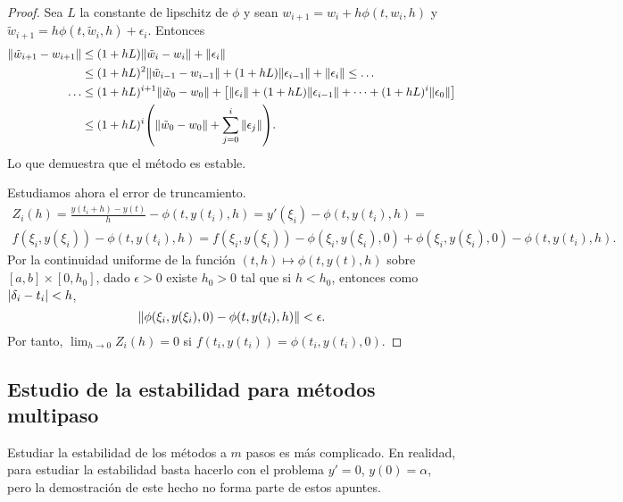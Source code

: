 \begin{proof}
    \newcommand{\tw}{\tilde{w}}
    Sea $L$ la constante de lipschitz de $\phi$ y
    sean $w_{i+1} = w_i + h\phi(t, w_i, h)$ y
    $\tw_{i+1} = h\phi(t, \tw_i, h) + \epsilon_i$.
    Entonces
    \begin{align*}
        \norm{\tw_{i+1} - w_{i+1}} & {} \le
            (1 + hL)\norm{\tw_i - w_i} + \norm{\epsilon_i} \\
        & \le (1 + hL)^2\norm{\tw_{i-1} - w_{i-1}}
            + (1 + hL)\norm{\epsilon_{i-1}} + \norm{\epsilon_i} \le \ldots \\
        \ldots & \le (1 + hL)^{i+1}\norm{\tw_0 - w_0} + \qty[
            \norm{\epsilon_i} + (1 + hL)\norm{\epsilon_{i-1}} + \dots
            + (1 + hL)^i\norm{\epsilon_0}
        ] \\
        & \le (1 + hL)^i\qty(
            \norm{\tw_0 - w_0} + \sum_{j=0}^i \norm{\epsilon_j}
        ).
    \end{align*}
    Lo que demuestra que el método es estable.

    Estudiamos ahora el error de truncamiento.
    \begin{multline*}
        Z_i(h) = \frac{y(t_i + h) - y(t)}{h} - \phi(t, y(t_i), h) =
        y'(\xi_i) - \phi(t, y(t_i), h) = \\
        f(\xi_i, y(\xi_i)) - \phi(t, y(t_i), h) =
        f(\xi_i, y(\xi_i)) - \phi(\xi_i, y(\xi_i), 0)
            + \phi(\xi_i, y(\xi_i), 0) - \phi(t, y(t_i), h).
    \end{multline*}
    Por la continuidad uniforme de la función
    $(t, h) \mapsto \phi(t, y(t), h)$
    sobre $[a, b] \times [0, h_0]$,
    dado $\epsilon > 0$ existe $h_0 > 0$ tal que si $h < h_0$,
    entonces como $\abs{\delta_i - t_i} < h$,
    \begin{equation*}
        \norm{\phi(\xi_i, y(\xi_i), 0) - \phi(t, y(t_i), h)} < \epsilon.
    \end{equation*}
    Por tanto, $\lim_{h \to 0} Z_i(h) = 0$
    si $f(t_i, y(t_i)) = \phi(t_i, y(t_i), 0)$.
\end{proof}

\subsection{Estudio de la estabilidad para métodos multipaso}

Estudiar la estabilidad de los métodos a $m$ pasos es más complicado.
En realidad, para estudiar la estabilidad basta hacerlo con el problema
$y' = 0$, $y(0) = \alpha$,
pero la demostración de este hecho no forma parte de estos apuntes.

